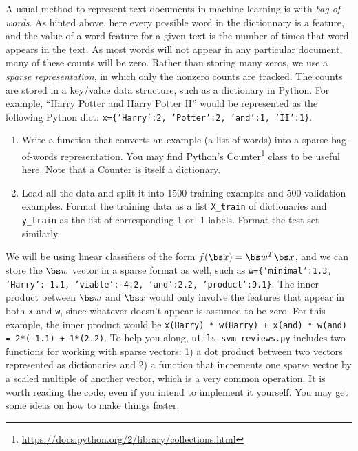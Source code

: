 \documentclass{article}
\newcommand{\code}[1]{\texttt{#1}}
\theoremstyle{plain}
\theoremstyle{definition}
\begin{document}
A usual method to represent text documents in machine learning
is with \emph{bag-of-words}. As hinted above, here every possible word in the dictionnary
is a feature, and the value of a word feature for a given text is the number of times that word appears in the text. As most words will not
appear in any particular document, many of these counts will be zero.
Rather than storing many zeros, we use a \emph{sparse representation},
in which only the nonzero counts are tracked. The counts are
stored in a key/value data structure, such as a dictionary in Python. For
example, ``Harry Potter and Harry Potter II'' would be represented
as the following Python dict: \code{x=\{'Harry':2, 'Potter':2, 'and':1, 'II':1\}}.


\begin{enumerate}
  \setcounter{enumi}{\value{saveenum}}
\item Write a function that converts an example (a list of words) into
a sparse bag-of-words representation. You may find Python's Counter\footnote{\url{https://docs.python.org/2/library/collections.html}}
class to be useful here. Note that a Counter is itself a dictionary.
\item Load all the data and split it into 1500 training examples
and 500 validation examples. Format the training data as a list \code{X\_train} of dictionaries and \code{y\_train} as the list of corresponding 1 or -1 labels. Format the test set similarly.
\setcounter{saveenum}{\value{enumi}}
\end{enumerate}




We will be using linear classifiers of the form $f(\bs x)=\bs w^{T} \bs x$, and
we can store the $\bs w$ vector in a sparse format as well, such as \code{w=\{'minimal':1.3, 'Harry':-1.1, 'viable':-4.2, 'and':2.2, 'product':9.1\}}.
The inner product between $\bs w$ and $\bs x$ would only involve the features
that appear in both \code{x} and \code{w}, since whatever doesn't
appear is assumed to be zero. For this example, the inner product
would be \code{x(Harry) {*} w(Harry) + x(and) {*} w(and) = 2{*}(-1.1)
+ 1{*}(2.2)}. To help you along, \code{utils\_svm\_reviews.py} includes two functions for working with
sparse vectors: 1) a dot product between two vectors represented as
dictionaries and 2) a function that increments one sparse vector by a scaled
multiple of another vector, which is a very common operation. It is
worth reading the code, even if you intend to implement it yourself.
You may get some ideas on how to make things faster. 
\end{document}
